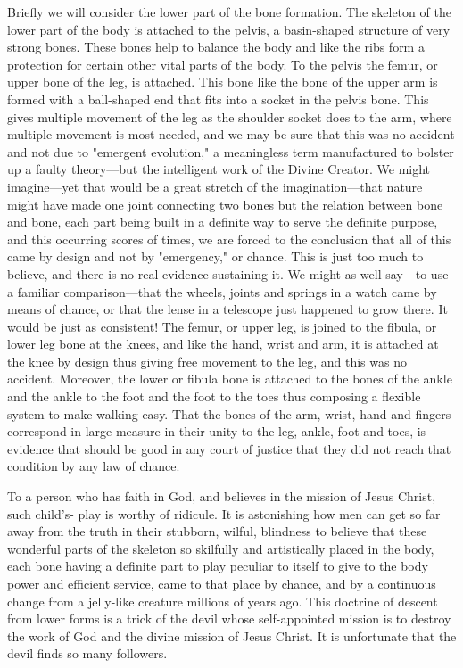 Briefly we will consider the lower part of the bone formation. The skeleton of the lower part
of the body is attached to the pelvis, a basin-shaped structure of very strong bones. These
bones help to balance the body and like the ribs form a protection for certain other vital parts
of the body. To the pelvis the femur, or upper bone of the leg, is attached. This bone like the
bone of the upper arm is formed with a ball-shaped end that fits into a socket in the pelvis
bone. This gives multiple movement of the leg as the shoulder socket does to the arm, where
multiple movement is most needed, and we may be sure that this was no accident and not due
to "emergent evolution," a meaningless term manufactured to bolster up a faulty theory—but
the intelligent work of the Divine Creator. We might imagine—yet that would be a great
stretch of the imagination—that nature might have made one joint connecting two bones but
the relation between bone and bone, each part being built in a definite way to serve the
definite purpose, and this occurring scores of times, we are forced to the conclusion that all
of this came by design and not by "emergency," or chance. This is just too much to believe,
and there is no real evidence sustaining it. We might as well say—to use a familiar
comparison—that the wheels, joints and springs in a watch came by means of chance, or that
the lense in a telescope just happened to grow there. It would be just as consistent! The
femur, or upper leg, is joined to the fibula, or lower leg bone at the knees, and like the hand,
wrist and arm, it is attached at the knee by design thus giving free movement to the leg, and
this was no accident. Moreover, the lower or fibula bone is attached to the bones of the ankle
and the ankle to the foot and the foot to the toes thus composing a flexible system to make
walking easy. That the bones of the arm, wrist, hand and fingers correspond in large measure
in their unity to the leg, ankle, foot and toes, is evidence that should be good in any court of
justice that they did not reach that condition by any law of chance.

To a person who has faith in God, and believes in the mission of Jesus Christ, such child's-
play is worthy of ridicule. It is astonishing how men can get so far away from the truth in
their stubborn, wilful, blindness to believe that these wonderful parts of the skeleton so
skilfully and artistically placed in the body, each bone having a definite part to play peculiar
to itself to give to the body power and efficient service, came to that place by chance, and by
a continuous change from a jelly-like creature millions of years ago. This doctrine of descent
from lower forms is a trick of the devil whose self-appointed mission is to destroy the work
of God and the divine mission of Jesus Christ. It is unfortunate that the devil finds so many
followers.

